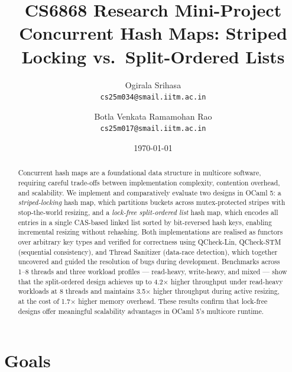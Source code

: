 \documentclass[11pt,a4paper]{article}
\title{%
  \textbf{CS6868 Research Mini-Project} \\[0.3em]
  \Large Concurrent Hash Maps: Striped Locking vs.\ Split-Ordered Lists%
}
\author{%
  Ogirala Srihasa \\ \texttt{cs25m034@smail.iitm.ac.in}
  \and
  Botla Venkata Ramamohan Rao \\ \texttt{cs25m017@smail.iitm.ac.in}
}
\date{\today}
\begin{document}
\maketitle

\begin{abstract}
Concurrent hash maps are a foundational data structure in multicore software, requiring careful trade-offs between implementation complexity, contention overhead, and scalability. We implement and comparatively evaluate two designs in OCaml 5: a \emph{striped-locking} hash map, which partitions buckets across mutex-protected stripes with stop-the-world resizing, and a \emph{lock-free split-ordered list }hash map, which encodes all entries in a single CAS-based linked list sorted by bit-reversed hash keys, enabling incremental resizing without rehashing. Both implementations are realised as functors over arbitrary key types and verified for correctness using QCheck-Lin, QCheck-STM (sequential consistency), and Thread Sanitizer (data-race detection), which together uncovered and guided the resolution of bugs during development. Benchmarks across 1–8 threads and three workload profiles — read-heavy, write-heavy, and mixed — show that the split-ordered design achieves up to 4.2× higher throughput under read-heavy workloads at 8 threads and maintains 3.5× higher throughput during active resizing, at the cost of 1.7× higher memory overhead. These results confirm that lock-free designs offer meaningful scalability advantages in OCaml 5's multicore runtime.
\end{abstract}

\section{Goals}
\label{sec:goals}
\end{document}
